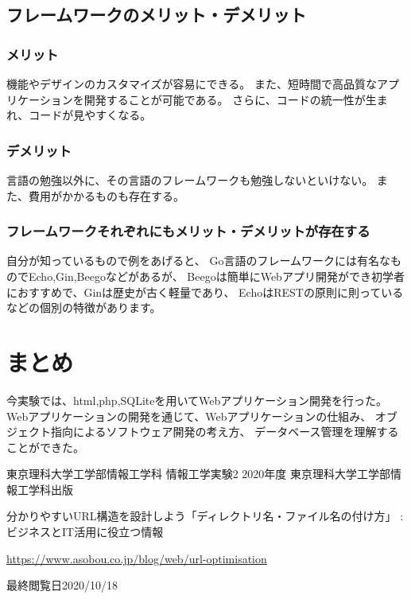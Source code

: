 \documentclass[12pt]{jarticle}
\begin{document}
\subsection{フレームワークのメリット・デメリット}
\subsubsection*{メリット}
機能やデザインのカスタマイズが容易にできる。
また、短時間で高品質なアプリケーションを開発することが可能である。
さらに、コードの統一性が生まれ、コードが見やすくなる。

\subsubsection*{デメリット}
言語の勉強以外に、その言語のフレームワークも勉強しないといけない。
また、費用がかかるものも存在する。

\subsubsection*{フレームワークそれぞれにもメリット・デメリットが存在する}
自分が知っているもので例をあげると、
Go言語のフレームワークには有名なものでEcho,Gin,Beegoなどがあるが、
Beegoは簡単にWebアプリ開発ができ初学者におすすめで、Ginは歴史が古く軽量であり、
EchoはRESTの原則に則っているなどの個別の特徴があります。
\section{まとめ}
今実験では、html,php,SQLiteを用いてWebアプリケーション開発を行った。
Webアプリケーションの開発を通じて、Webアプリケーションの仕組み、
オブジェクト指向によるソフトウェア開発の考え方、
データベース管理を理解することができた。
\clearpage

\begin{thebibliography}{99}
    \label{sannkoubunnkenn_chapter}
    東京理科大学工学部情報工学科 情報工学実験2 2020年度
    東京理科大学工学部情報工学科出版

    分かりやすいURL構造を設計しよう「ディレクトリ名・ファイル名の付け方」 : ビジネスとIT活用に役立つ情報

    \url{https://www.asobou.co.jp/blog/web/url-optimisation}

    最終閲覧日2020/10/18
\end{thebibliography}


\clearpage

\appendix
\end{document}
